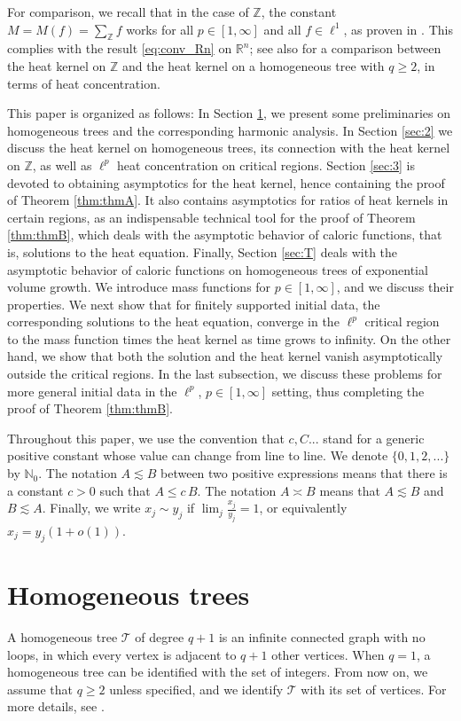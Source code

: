 \documentclass[10pt,a4paper]{amsart}
\renewcommand\mathcal{\mathscr}
\theoremstyle{plain}
\theoremstyle{remark}
\theoremstyle{definition}
\begin{document}
	For comparison, we recall that in the case of $\mathbb{Z}$, the constant $M=M(f)=\sum_{\mathbb{Z}}f$ works for all $p\in[1,\infty]$ and all $f\in \ell^1$, as proven in \cite{Abadiasetal}. This complies with the result \eqref{eq:conv_Rn} on $\mathbb{R}^n$; see also \cite{MedSe} for a comparison between the heat kernel on $\mathbb{Z}$ and the heat kernel on a homogeneous tree with $q\geq2$, in terms of heat concentration.

This paper is organized as follows: In Section \ref{sec:1}, we present some preliminaries on homogeneous trees and the
corresponding harmonic analysis. In Section \ref{sec:2} we discuss the heat kernel on homogeneous trees, its connection with the heat kernel on $\mathbb{Z}$,  as
well as $\ell^p$ heat concentration on critical regions. Section \ref{sec:3} is devoted to obtaining asymptotics for the heat kernel, hence containing the proof of Theorem \ref{thm:thmA}. It also contains asymptotics for ratios of heat kernels in certain regions, as an indispensable technical tool for the proof of Theorem \ref{thm:thmB}, which deals with the asymptotic behavior of caloric functions, that is, solutions to the heat equation. Finally, Section \ref{sec:T} deals with the
asymptotic behavior of caloric functions on homogeneous trees of exponential volume growth. We introduce mass functions for $p\in [1, \infty]$, and we discuss
their properties. We next show that for finitely supported initial data, the corresponding solutions to the heat equation, converge in the $\ell^p$
critical region to the mass function times the heat kernel as time grows to infinity. On the other hand, we
show that both the solution and the heat kernel vanish asymptotically outside the critical regions. In the last
subsection, we discuss these problems for more general initial data in the $\ell^p$, $p\in [1, \infty]$ setting, thus completing the proof of Theorem \ref{thm:thmB}.

 Throughout this paper, we use the convention that $c, C...$
stand for a generic positive
constant whose value can change from line to line. We denote $\{0,1,2,...\}$ by $\mathbb{N}_0$. The notation $A\lesssim B$ between two positive expressions
means that there is a constant $c>0$ such that $A\leq c \, B$. The notation $A\asymp B$ means that $A\lesssim B$ and $B\lesssim A$. Finally, we write $x_j\sim y_j$ if $\lim_{j}\frac{x_j}{y_j}=1$, or equivalently $x_j=y_j(1+o(1))$.
   
	
	\section{Homogeneous trees}\label{sec:1}
	A homogeneous tree $\mathcal{T}$ of degree $q+1$ is an infinite connected graph with no loops, in which every vertex is adjacent to $q+1$ other vertices. When $q=1$, a homogeneous tree can be identified with the set of integers. From now on, we assume that $q\geq 2$ unless specified, and we identify $\mathcal{T}$ with its set of vertices. For more details, see \cite{CMS0, CMS, Figa}.
	
\end{document}
